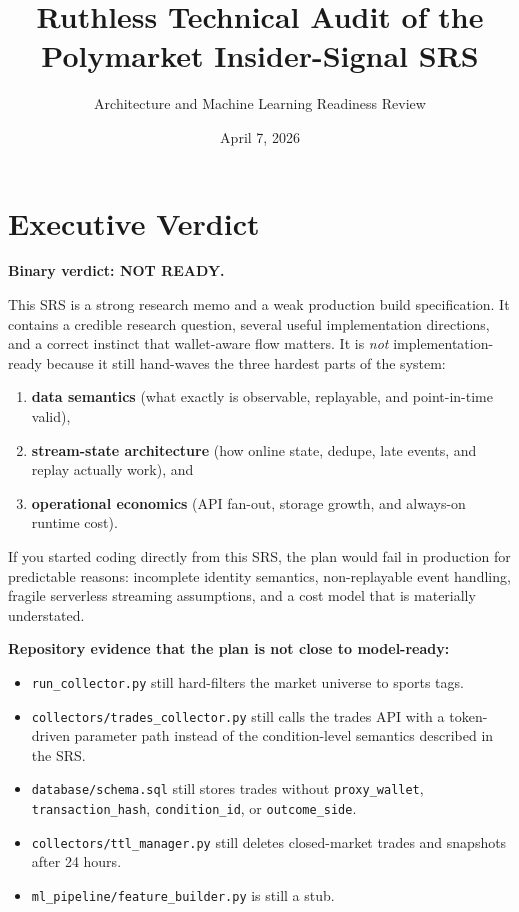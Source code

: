 \documentclass[11pt,letterpaper]{article}
\title{\textbf{Ruthless Technical Audit of the Polymarket Insider-Signal SRS}}
\author{Architecture and Machine Learning Readiness Review}
\date{April 7, 2026}
\newcommand{\notready}{\textbf{\textcolor{red!75!black}{NOT READY}}}
\begin{document}
\maketitle
\tableofcontents
\newpage

\section{Executive Verdict}

\textbf{Binary verdict: \notready.}

This SRS is a strong research memo and a weak production build specification. It contains a credible research question, several useful implementation directions, and a correct instinct that wallet-aware flow matters. It is \emph{not} implementation-ready because it still hand-waves the three hardest parts of the system:

\begin{enumerate}[nosep]
    \item \textbf{data semantics} (what exactly is observable, replayable, and point-in-time valid),
    \item \textbf{stream-state architecture} (how online state, dedupe, late events, and replay actually work), and
    \item \textbf{operational economics} (API fan-out, storage growth, and always-on runtime cost).
\end{enumerate}

If you started coding directly from this SRS, the plan would fail in production for predictable reasons: incomplete identity semantics, non-replayable event handling, fragile serverless streaming assumptions, and a cost model that is materially understated.

\textbf{Repository evidence that the plan is not close to model-ready:}
\begin{itemize}[nosep]
    \item \texttt{run\_collector.py} still hard-filters the market universe to sports tags.
    \item \texttt{collectors/trades\_collector.py} still calls the trades API with a token-driven parameter path instead of the condition-level semantics described in the SRS.
    \item \texttt{database/schema.sql} still stores trades without \texttt{proxy\_wallet}, \texttt{transaction\_hash}, \texttt{condition\_id}, or \texttt{outcome\_side}.
    \item \texttt{collectors/ttl\_manager.py} still deletes closed-market trades and snapshots after 24 hours.
    \item \texttt{ml\_pipeline/feature\_builder.py} is still a stub.
\end{itemize}
\end{document}
